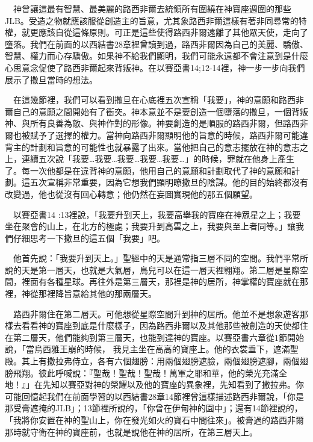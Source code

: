 \documentclass{book}
\begin{document}
\begin{center}
\noindent{}
\end{center}

　神曾讓這最有智慧、最美麗的路西非爾去統領所有圍繞在神寶座週圍的那些JLB。受造之物就應該服從創造主的旨意，尤其象路西非爾這樣有著非同尋常的特權，就更應該自從這條原則。可正是這些使得路西非爾遠離了其他眾天使，走向了墮落。我們在前面的以西結書28章裡曾讀到過，路西非爾因為自己的美麗、驕傲、智慧、權力而心存驕傲。如果神不給我們顯明，我們可能永遠都不會注意到是什麼心思意念促使了路西非爾起來背叛神。在以賽亞書14;12-14裡，神一步一步向我們展示了撒旦當時的想法。

　在這幾節裡，我們可以看到撒旦在心底裡五次宣稱「我要」，神的意願和路西非爾自己的意願之間開始有了衝突。神本意並不是要創造一個墮落的撒旦，一個背叛神、與所有良善為敵、與神作對的形像。神要創造的是順服的路西非爾，但路西非爾也被賦予了選擇的權力。當神向路西非爾顯明他的旨意的時候，路西非爾可能違背主的計劃和旨意的可能性也就暴露了出來。當他把自己的意志擺放在神的意志之上，連續五次說「我要…我要…我要…我要…我要…」的時候，罪就在他身上產生了。每一次他都是在違背神的意願，他用自己的意願和計劃取代了神的意願和計劃。這五次宣稱非常重要，因為它想我們顯明瞭撒旦的陰謀。他的目的始終都沒有改變過，他也從沒有回心轉意；他仍然在妄圖實現他的那五個願望。

　以賽亞書14 :13裡說，「我要升到天上，我要高舉我的寶座在神眾星之上；我要坐在聚會的山上，在北方的極處；我要升到高雲之上，我要與至上者同等。」讓我們仔細思考一下撒旦的這五個「我要」吧。

　他首先說：「我要升到天上。」聖經中的天是通常指三層不同的空間。我們平常所說的天是第一層天，也就是大氣層，鳥兒可以在這一層天裡翱翔。第二層是星際空間，裡面有各種星球。再往外是第三層天，那裡是神的居所，神掌權的寶座就在那裡，神從那裡降旨意給其他的那兩層天。

　路西非爾住在第二層天。可他想從星際空間升到神的居所。他並不是想象遊客那樣去看看神的寶座到底是什麼樣子，因為路西非爾以及其他那些被創造的天使都住在第二層天，他們能夠到第三層天，也能到達神的寶座。以賽亞書六章從1節開始說，「當烏西雅王崩的時候， 我見主坐在高高的寶座上。他的衣裳垂下，遮滿聖殿。其上有撒拉弗侍立，各有六個翅膀：用兩個翅膀遮臉，兩個翅膀遮腳，兩個翅膀飛翔。彼此呼喊說：『聖哉！聖哉！聖哉！萬軍之耶和華，他的榮光充滿全地！』」在先知以賽亞對神的榮耀以及他的寶座的異象裡，先知看到了撒拉弗。你可能回憶起我們在前面學習的以西結書28章14節裡曾這樣描述路西非爾說，「你是那受膏遮掩的JLB」；13節裡所說的，「你曾在伊甸神的園中」；還有14節裡說的，「我將你安置在神的聖山上，你在發光如火的寶石中間往來」。被膏過的路西非爾那時就守衛在神的寶座前，也就是說他在神的居所，在第三層天上。
\end{document}
